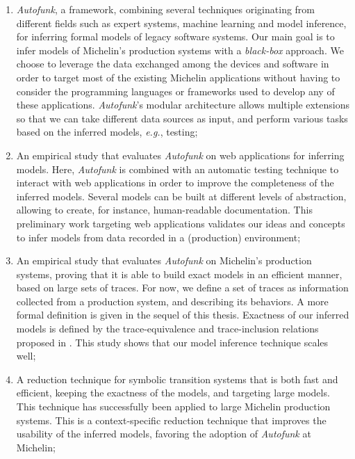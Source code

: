 \begin{enumerate}
    \item \textit{Autofunk}, a framework, combining several
        techniques originating from different fields such as
        expert systems, machine learning and model inference, for
        inferring formal models of legacy software systems. Our
        main goal is to infer models of Michelin's production
        systems with a \emph{black-box} approach. We choose to
        leverage the data exchanged among the devices and
        software in order to target most of the existing Michelin
        applications without having to consider the programming
        languages or frameworks used to develop any of these
        applications. \textit{Autofunk}'s modular architecture
        allows multiple extensions so that we can take different
        data sources as input, and perform various tasks based on
        the inferred models, \emph{e.g.}, testing;

    \item An empirical study that evaluates \textit{Autofunk} on
        web applications for inferring models. Here,
        \textit{Autofunk} is combined with an automatic testing
        technique to interact with web applications in order to
        improve the completeness of the inferred models. Several
        models can be built at different levels of abstraction,
        allowing to create, for instance, human-readable
        documentation. This preliminary work targeting web
        applications validates our ideas and concepts to infer
        models from data recorded in a (production) environment;

    \item An empirical study that evaluates \textit{Autofunk} on
        Michelin's production systems, proving that it is able to
        build exact models in an efficient manner, based on large
        sets of traces. For now, we define a set of traces as
        information collected from a production system, and
        describing its behaviors. A more formal definition is
        given in the sequel of this thesis. Exactness of our
        inferred models is defined by the trace-equivalence and
        trace-inclusion relations proposed in \cite{petrenko06}.
        This study shows that our model inference technique
        scales well;

    \item A reduction technique for symbolic transition systems
        that is both fast and efficient, keeping the exactness of
        the models, and targeting large models. This technique
        has successfully been applied to large Michelin
        production systems. This is a context-specific reduction
        technique that improves the usability of the inferred
        models, favoring the adoption of \emph{Autofunk} at
        Michelin;


\end{enumerate}
